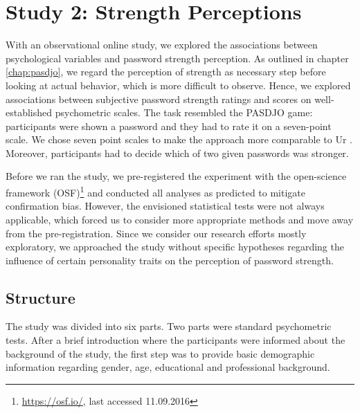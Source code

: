 \section{Study 2: Strength Perceptions}
With an observational online study, we explored the associations between psychological variables and password strength perception. As outlined in chapter \ref{chap:pasdjo}, we regard the perception of strength as necessary step before looking at actual behavior, which is more difficult to observe. Hence, we explored associations between subjective password strength ratings and scores on well-established psychometric scales. 
The task resembled the PASDJO game: participants were shown a password and they had to rate it on a seven-point scale. We chose seven point scales to make the approach more comparable to Ur \etal \cite{Ur2016PerceptionsPassword}. Moreover, participants had to decide which of two given passwords was stronger. 

Before we ran the study, we pre-registered the experiment with the open-science framework (OSF)\footnote{\url{https://osf.io/}, last accessed 11.09.2016} and conducted all analyses as predicted to mitigate confirmation bias. However, the envisioned statistical  tests were not always applicable, which forced us to consider more appropriate methods and move away from the pre-registration. Since we consider our research efforts mostly exploratory, we approached the study without specific hypotheses regarding the influence of certain personality traits on the perception of password strength.

\subsection{Structure}
The study was divided into six parts. Two parts were standard psychometric tests. After a brief introduction where the participants were informed about the background of the study, the first step was to provide basic demographic information regarding gender, age, educational and professional background. %


